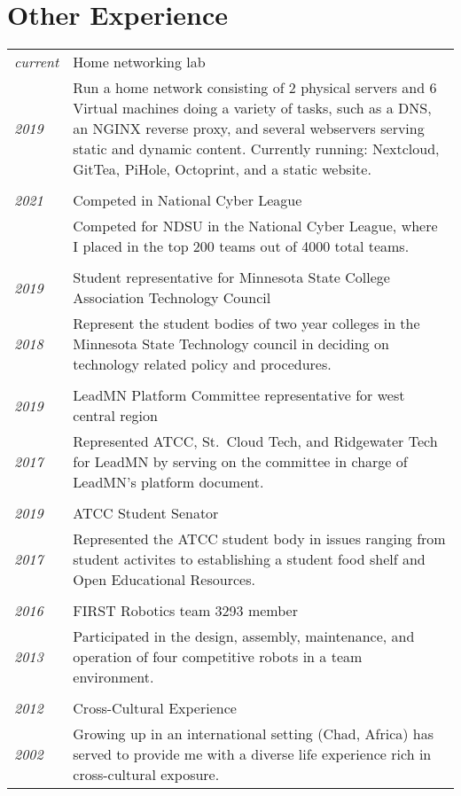 \documentclass[letterpaper,10pt]{article}
\begin{document}
\section*{Other Experience}
	\begin{tabular}{R{2cm}|p{14cm}}
	\textsl{current} & Home networking lab\\
	\textsl{2019} & Run a home network consisting of 2 physical servers and 6 Virtual machines doing a variety of tasks, such as a DNS, an NGINX reverse proxy, and several webservers serving static and dynamic content. Currently running: Nextcloud, GitTea, PiHole, Octoprint, and a static website.\\
	\\
	\textsl{2021} & Competed in National Cyber League\\
	& Competed for NDSU in the National Cyber League, where I placed in the top 200 teams out of 4000 total teams.\\
	\\
	\textsl{2019} & Student representative for Minnesota State College Association Technology Council\\
	\textsl{2018} & Represent the student bodies of two year colleges in the Minnesota State Technology council in deciding on technology related policy and procedures.\\
	\\
	\textsl{2019} & LeadMN Platform Committee representative for west central region\\
	\textsl{2017} & Represented ATCC, St.\ Cloud Tech, and Ridgewater Tech for LeadMN by serving on the committee in charge of LeadMN's platform document.\\
	\\
	\textsl{2019} & ATCC Student Senator\\
	\textsl{2017} & Represented the ATCC student body in issues ranging from student activites to establishing a student food shelf and Open Educational Resources.\\
	\\
	\textsl{2016} & FIRST Robotics team 3293 member\\
	\textsl{2013} & Participated in the design, assembly, maintenance, and operation of four competitive robots in a team environment.\\
	\\
	\textsl{2012} & Cross-Cultural Experience\\
	\textsl{2002} &Growing up in an international setting (Chad, Africa) has served to provide me with a diverse life experience rich in cross-cultural exposure.\\
	\end{tabular}
	
\end{document}
